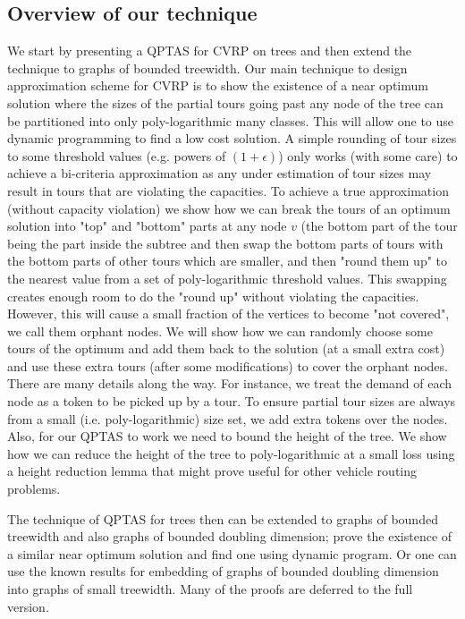 \documentclass[twoside,leqno]{article}
\newcommand{\eps}{\epsilon}
\begin{document}
\subsection{Overview of our technique}
We start by presenting a QPTAS for CVRP on trees and then extend the technique to graphs of bounded
treewidth.
Our main technique to design approximation scheme for CVRP is to show the existence of a near optimum solution where the sizes of the partial tours going past any node of the tree can be partitioned into
only poly-logarithmic many classes. This will allow one to use dynamic programming to find a low cost solution. A simple rounding of tour sizes to some threshold values (e.g. powers of $(1+\eps)$) only works (with some care) to achieve a
bi-criteria approximation as any under estimation of tour sizes may result in tours that are violating the capacities. To achieve a true approximation (without capacity violation) we show how we can break the tours of an optimum solution into "top" and "bottom" parts at any node $v$ (the bottom part of the tour being the part inside the subtree  and then swap the bottom parts of tours with the bottom parts of other tours which are smaller, and then "round them up" to the nearest value from a set of poly-logarithmic threshold values. This swapping creates enough room to do the "round up" without violating the capacities. However, this will cause a small fraction of the vertices to become "not covered", we call them  orphant nodes. We will show how we can randomly choose some tours of the optimum and add them back to the solution (at a small extra cost) and use these extra tours (after some modifications) to cover the orphant nodes. There are many details along the way. For instance, we treat the demand of each node as a token to be picked up by a tour. To ensure partial
tour sizes are always from a small (i.e. poly-logarithmic) size set, we add extra tokens over the nodes. 
Also, for our QPTAS to work we need to bound the height of the tree. We show how we can reduce the height of the tree to poly-logarithmic at a small loss using a height reduction lemma that might prove useful for other vehicle routing problems.

The technique of QPTAS for trees then can be extended to graphs of bounded treewidth and also graphs of bounded doubling dimension; prove the existence of a similar near optimum solution and find one using dynamic program. Or one can use the known results for embedding of graphs of bounded doubling dimension into graphs of small treewidth.
Many of the proofs are deferred to the full version.
\end{document}
